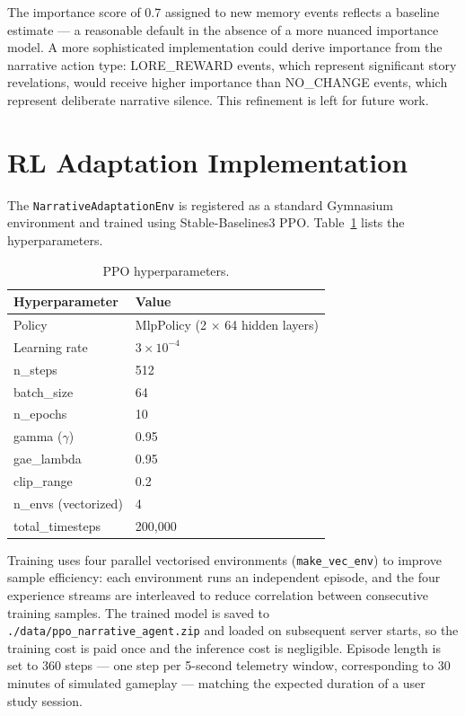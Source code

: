 The importance score of 0.7 assigned to new memory events reflects a baseline estimate --- a reasonable default in the absence of a more nuanced importance model. A more sophisticated implementation could derive importance from the narrative action type: LORE\_REWARD events, which represent significant story revelations, would receive higher importance than NO\_CHANGE events, which represent deliberate narrative silence. This refinement is left for future work.

\section{RL Adaptation Implementation}

The \texttt{NarrativeAdaptationEnv} is registered as a standard Gymnasium environment and trained using Stable-Baselines3 PPO. Table~\ref{tab:ppo_hyperparams} lists the hyperparameters.

\begin{table}[H]
\centering
\caption{PPO hyperparameters.}
\label{tab:ppo_hyperparams}
\small
\begin{tabular}{@{}ll@{}}
\toprule
\textbf{Hyperparameter} & \textbf{Value} \\
\midrule
Policy & MlpPolicy (2 $\times$ 64 hidden layers) \\
Learning rate & $3 \times 10^{-4}$ \\
n\_steps & 512 \\
batch\_size & 64 \\
n\_epochs & 10 \\
gamma ($\gamma$) & 0.95 \\
gae\_lambda & 0.95 \\
clip\_range & 0.2 \\
n\_envs (vectorized) & 4 \\
total\_timesteps & 200,000 \\
\bottomrule
\end{tabular}
\end{table}

Training uses four parallel vectorised environments (\texttt{make\_vec\_env}) to improve sample efficiency: each environment runs an independent episode, and the four experience streams are interleaved to reduce correlation between consecutive training samples. The trained model is saved to \texttt{./data/ppo\_narrative\_agent.zip} and loaded on subsequent server starts, so the training cost is paid once and the inference cost is negligible. Episode length is set to 360 steps --- one step per 5-second telemetry window, corresponding to 30 minutes of simulated gameplay --- matching the expected duration of a user study session.

